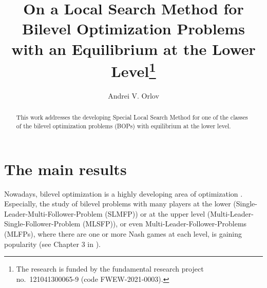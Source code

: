 \documentclass[12pt]{llncs}
\begin{document}
%
\fi
\title{On a Local Search Method for Bilevel Optimization Problems with an Equilibrium at the Lower Level\thanks{The research is funded by the fundamental research project no.~121041300065-9 (code FWEW-2021-0003).}}
\author{Andrei V. Orlov%
}

\maketitle

\begin{abstract}
This work addresses the developing Special Local Search Method for one of the classes of the bilevel optimization problems (BOPs) with equilibrium at the lower level. 

\end{abstract}

\section{The main results}

Nowadays, bilevel optimization is a highly developing area of optimization \cite{NewBilevelBook}.
Especially, the study of bilevel problems with many players at the lower (Single-Leader-Multi-Follower-Problem (SLMFP))
or at the upper level (Multi-Leader-Single-Follower-Problem (MLSFP)), or even Multi-Leader-Fol\-lo\-wer-Prob\-lems (MLFPs), where there are one or more Nash games at each level, is gaining popularity (see Chapter 3 in \cite{NewBilevelBook}).
\end{document}
